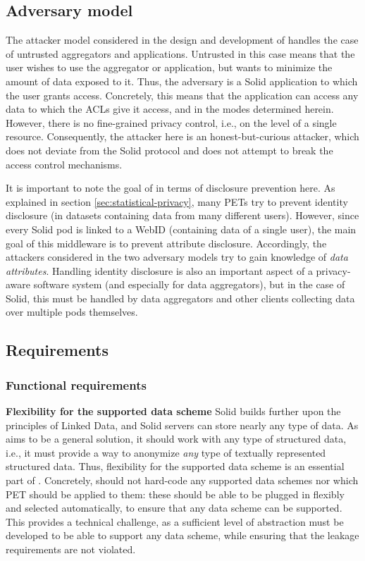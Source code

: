 \subsection{Adversary model}
\label{sec:attacker-model}
The attacker model considered in the design and development of \middleware{} handles the case of untrusted aggregators and applications. Untrusted in this case means that the user wishes to use the aggregator or application, but wants to minimize the amount of data exposed to it. Thus, the adversary is a Solid application to which the user grants access. Concretely, this means that the application can access any data to which the \gls{ACL}s give it access, and in the modes determined herein. However, there is no fine-grained privacy control, i.e., on the level of a single resource. Consequently, the attacker here is an honest-but-curious attacker, which does not deviate from the Solid protocol and does not attempt to break the access control mechanisms.

It is important to note the goal of \middleware{} in terms of disclosure prevention here. As explained in section \ref{sec:statistical-privacy}, many \gls{PETs} try to prevent identity disclosure (in datasets containing data from many different users). However, since every Solid pod is linked to a WebID (containing data of a single user), the main goal of this middleware is to prevent attribute disclosure. Accordingly, the attackers considered in the two adversary models try to gain knowledge of \textit{data attributes}. Handling identity disclosure is also an important aspect of a privacy-aware software system (and especially for data aggregators), but in the case of Solid, this must be handled by data aggregators and other clients collecting data over multiple pods themselves.

\subsection{Requirements}
\label{sec:requirements}

\subsubsection{Functional requirements}
\noindent \textbf{Flexibility for the supported data scheme} Solid builds further upon the principles of Linked Data, and Solid servers can store nearly any type of data. As \middleware{} aims to be a general solution, it should work with any type of structured data, i.e., it must provide a way to anonymize \textit{any} type of textually represented structured data. Thus, flexibility for the supported data scheme is an essential part of \middleware{}. Concretely, \middleware{} should not hard-code any supported data schemes nor which PET should be applied to them: these should be able to be plugged in flexibly and selected automatically, to ensure that any data scheme can be supported. This provides a technical challenge, as a sufficient level of abstraction must be developed to be able to support any data scheme, while ensuring that the leakage requirements are not violated. \\

